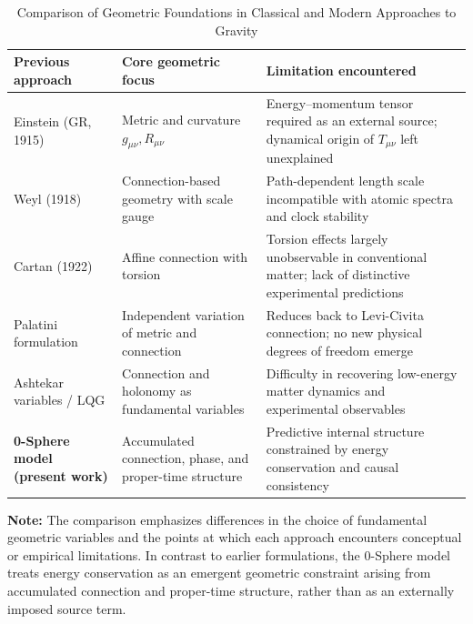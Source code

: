 \documentclass[%
 reprint,
 amsmath,amssymb,
 aps,
 prb,
]{revtex4-2}
\numberwithin{equation}{section}
\begin{document}
\clearpage

\begin{table}[t!]
\centering
\caption{Comparison of Geometric Foundations in Classical and Modern Approaches to Gravity}
\label{tab:historical_comparison_geometry}
\renewcommand{\arraystretch}{1.4}
\begin{tabular}{p{5.0cm}p{5.5cm}p{5.5cm}}
\toprule
\textbf{Previous approach} & \textbf{Core geometric focus} & \textbf{Limitation encountered} \\
\midrule
Einstein (GR, 1915) & Metric and curvature $g_{\mu\nu}, R_{\mu\nu}$ & Energy--momentum tensor required as an external source; dynamical origin of $T_{\mu\nu}$ left unexplained \\
\addlinespace[0.3cm]
Weyl (1918) & Connection-based geometry with scale gauge & Path-dependent length scale incompatible with atomic spectra and clock stability \\
\addlinespace[0.3cm]
Cartan (1922) & Affine connection with torsion & Torsion effects largely unobservable in conventional matter; lack of distinctive experimental predictions \\
\addlinespace[0.3cm]
Palatini formulation & Independent variation of metric and connection & Reduces back to Levi-Civita connection; no new physical degrees of freedom emerge \\
\addlinespace[0.3cm]
Ashtekar variables / LQG & Connection and holonomy as fundamental variables & Difficulty in recovering low-energy matter dynamics and experimental observables \\
\addlinespace[0.3cm]
\textbf{0-Sphere model (present work)} & Accumulated connection, phase, and proper-time structure & Predictive internal structure constrained by energy conservation and causal consistency \\
\bottomrule
\end{tabular}
\vspace{0.2cm}
\begin{flushleft}
\footnotesize
\textbf{Note:} The comparison emphasizes differences in the choice of fundamental geometric variables and the points at which each approach encounters conceptual or empirical limitations. In contrast to earlier formulations, the 0-Sphere model treats energy conservation as an emergent geometric constraint arising from accumulated connection and proper-time structure, rather than as an externally imposed source term.
\end{flushleft}
\end{table}
\end{document}

